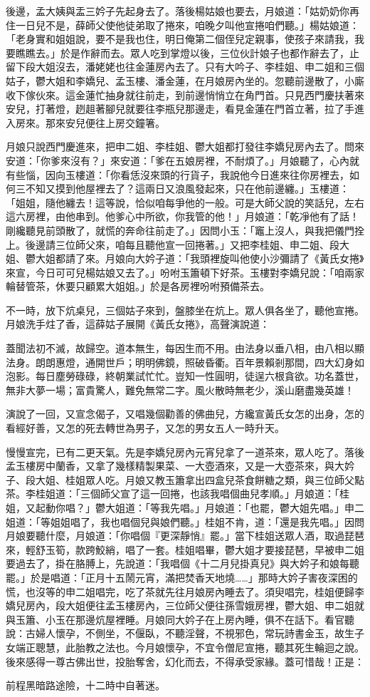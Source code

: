 後邊，孟大姨與盂三妗子先起身去了。落後楊姑娘也要去，月娘道：「姑奶奶你再住一日兒不是，薛師父使他徒弟取了捲來，咱晚夕叫他宣捲咱們聽。」楊姑娘道： 「老身實和姐姐說，要不是我也住，明日俺第二個侄兒定親事，使孩子來請我，我要瞧瞧去。」於是作辭而去。眾人吃到掌燈以後，三位伙計娘子也都作辭去了，止留下段大姐沒去，潘姥姥也往金蓮房內去了。只有大吟子、李桂姐、申二姐和三個姑子，鬱大姐和李嬌兒、孟玉樓、潘金蓮，在月娘房內坐的。忽聽前邊散了，小廝收下傢伙來。這金蓮忙抽身就往前走，到前邊悄悄立在角門首。只見西門慶扶著來安兒，打著燈，趔趄著腳兒就要往李瓶兒那邊走，看見金蓮在門首立著，拉了手進入房來。那來安兒便往上房交鐘箸。

月娘只說西門慶進來，把申二姐、李桂姐、鬱大姐都打發往李嬌兒房內去了。問來安道：「你爹來沒有？」來安道：「爹在五娘房裡，不耐煩了。」月娘聽了，心內就有些惱，因向玉樓道：「你看恁沒來頭的行貨子，我說他今日進來往你房裡去，如何三不知又摸到他屋裡去了？這兩日又浪風發起來，只在他前邊纏。」玉樓道： 「姐姐，隨他纏去！這等說，恰似咱每爭他的一般。可是大師父說的笑話兒，左右這六房裡，由他串到。他爹心中所欲，你我管的他！」月娘道：「乾凈他有了話！剛纔聽見前頭散了，就慌的奔命往前走了。」因問小玉：「竈上沒人，與我把儀門拴上。後邊請三位師父來，咱每且聽他宣一回捲著。」又把李桂姐、申二姐、段大姐、鬱大姐都請了來。月娘向大妗子道：「我頭裡旋叫他使小沙彌請了《黃氏女捲》來宣，今日可可兒楊姑娘又去了。」吩咐玉簫頓下好茶。玉樓對李嬌兒說：「咱兩家輪替管茶，休要只顧累大姐姐。」於是各房裡吩咐預備茶去。

不一時，放下炕桌兒，三個姑子來到，盤膝坐在炕上。眾人俱各坐了，聽他宣捲。月娘洗手炷了香，這薛姑子展開《黃氏女捲》，高聲演說道：

蓋聞法初不滅，故歸空。道本無生，每因生而不用。由法身以垂八相，由八相以顯法身。朗朗惠燈，通開世戶；明明佛鏡，照破昏衢。百年景賴剎那間，四大幻身如泡影。每日塵勞碌碌，終朝業試忙忙。豈知一性圓明，徒逞六根貪欲。功名蓋世，無非大夢一場；富貴驚人，難免無常二字。風火散時無老少，溪山磨盡幾英雄！

演說了一回，又宣念偈子，又唱幾個勸善的佛曲兒，方纔宣黃氏女怎的出身，怎的看經好善，又怎的死去轉世為男子，又怎的男女五人一時升天。

慢慢宣完，已有二更天氣。先是李嬌兒房內元宵兒拿了一道茶來，眾人吃了。落後孟玉樓房中蘭香，又拿了幾樣精製果菜、一大壺酒來，又是一大壺茶來，與大妗子、段大姐、桂姐眾人吃。月娘又教玉簫拿出四盒兒茶食餅糖之類，與三位師父點茶。李桂姐道：「三個師父宣了這一回捲，也該我唱個曲兒孝順。」月娘道：「桂姐，又起動你唱？」鬱大姐道：「等我先唱。」月娘道：「也罷，鬱大姐先唱。」申二姐道：「等姐姐唱了，我也唱個兒與娘們聽。」桂姐不肯，道：「還是我先唱。」因問月娘要聽什麼，月娘道：「你唱個『更深靜悄』罷。」當下桂姐送眾人酒，取過琵琶來，輕舒玉筍，款跨鮫綃，唱了一套。桂姐唱畢，鬱大姐才要接琵琶，早被申二姐要過去了，掛在胳膊上，先說道：「我唱個《十二月兒掛真兒》與大妗子和娘每聽罷。」於是唱道：「正月十五鬧元宵，滿把焚香天地燒……」那時大妗子害夜深困的慌，也沒等的申二姐唱完，吃了茶就先往月娘房內睡去了。須臾唱完，桂姐便歸李嬌兒房內，段大姐便往孟玉樓房內，三位師父便往孫雪娥房裡，鬱大姐、申二姐就與玉簫、小玉在那邊炕屋裡睡。月娘同大妗子在上房內睡，俱不在話下。看官聽說：古婦人懷孕，不側坐，不偃臥，不聽淫聲，不視邪色，常玩詩書金玉，故生子女端正聰慧，此胎教之法也。今月娘懷孕，不宜令僧尼宣捲，聽其死生輪迴之說。後來感得一尊古佛出世，投胎奪舍，幻化而去，不得承受家緣。蓋可惜哉！正是：

前程黑暗路途險，十二時中自著迷。

